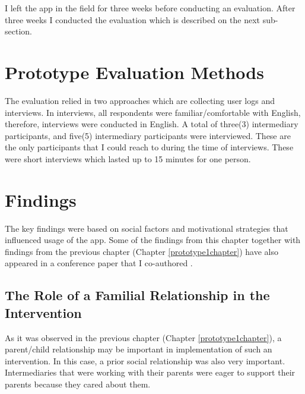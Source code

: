I left the app in the field for three weeks before conducting an evaluation. After three weeks I conducted the evaluation which is described on the next sub-section.
\section{Prototype Evaluation Methods}
The evaluation relied in two approaches which are collecting user logs and interviews. In interviews, all respondents were familiar/comfortable with English, therefore, interviews were conducted in English. A total of three(3) intermediary participants, and five(5) intermediary participants were interviewed. These are the only participants that I could reach to during the time of interviews. These were short interviews which lasted up to 15 minutes for one person. 
\section{Findings}
The key findings were based on social factors and motivational strategies that influenced usage of the app. Some of the findings from this chapter together with findings from the previous chapter (Chapter \ref{prototype1chapter}) have also appeared in a conference paper that I co-authored \citep{katule2016leveraging}.
\subsection{The Role of a Familial Relationship in the Intervention}
As it was observed in the previous chapter (Chapter \ref{prototype1chapter}), a parent/child relationship may be important in implementation of such an intervention. In this case, a prior social relationship was also very important. Intermediaries that were working with their parents were eager to support their parents because they cared about them. 


